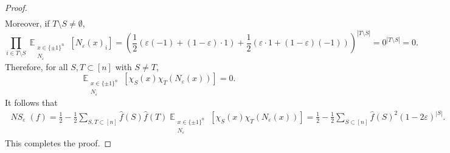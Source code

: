 \documentclass[letterpaper, reqno,11pt]{article}
\newcommand{\EE}{\mathop{{}\mathbb{E}}}
\DeclareMathOperator{\NS}{\mathit{NS}}
\begin{document}
\begin{enumerate}
\begin{proof}
\begin{align*}
    \end{align*}
    Moreover, if $T \setminus S \neq \emptyset$,
    $$ \prod_{i \in T \setminus S} \EE_{\substack{x \in \{ \pm 1 \}^n \\ N_\varepsilon}}\left[N_\varepsilon(x)_i\right] = \left(\frac{1}{2}(\varepsilon (-1) + (1 - \varepsilon) \cdot 1) + \frac{1}{2} (\varepsilon \cdot 1 + (1 - \varepsilon) (-1))\right)^{|T \setminus S|} = 0^{|T \setminus S|} = 0. $$
    Therefore, for all $S, T \subset [n]$ with $S \neq T$,
    $$ \EE_{\substack{x \in \{ \pm 1 \}^n \\ N_\varepsilon}}\left[\chi_S(x) \chi_T\left(N_\varepsilon(x)\right)\right] = 0. $$
    It follows that
    \begin{align*}
      \NS_\varepsilon(f) = \frac{1}{2} - \frac{1}{2} \sum_{S, T \subset [n]} \hat{f}(S) \hat{f}(T) \EE_{\substack{x \in \{ \pm 1 \}^n \\ N_\varepsilon}}\left[\chi_S(x) \chi_T\left(N_\varepsilon(x)\right)\right] = \frac{1}{2} - \frac{1}{2} \sum_{S \subset [n]} \hat{f}(S)^2 (1 - 2 \varepsilon)^{|S|}.
    \end{align*}
    This completes the proof.
  \end{proof}
\end{enumerate}
\end{document}
